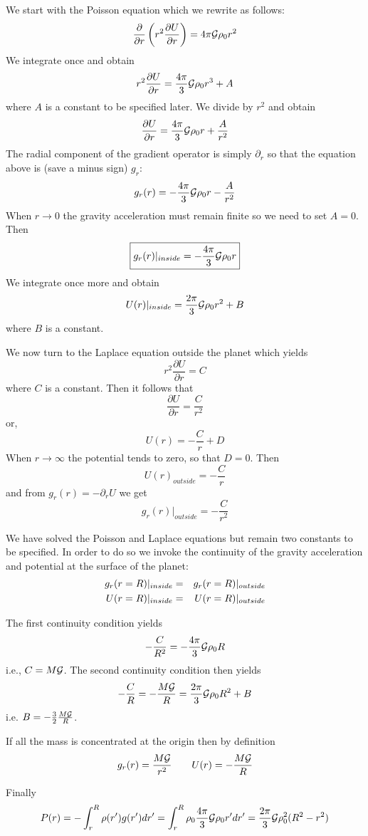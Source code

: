We start with the Poisson equation which we rewrite as follows:
\[
\frac{\partial }{\partial r}\left( r^2 \frac{\partial U}{\partial r}\right)
= 4 \pi {\cal G} \rho_0 r^2 
\]
We integrate once and obtain
\[
r^2 \frac{\partial U}{\partial r}
= \frac{4 \pi}{3} {\cal G} \rho_0 r^3 + A 
\]
where $A$ is a constant to be specified later. We divide by $r^2$ and obtain 
\[
\frac{\partial U}{\partial r}
= \frac{4 \pi}{3} {\cal G} \rho_0 r + \frac{A}{r^2}
\]
The radial component of the gradient operator is simply $\partial_r$ so that the equation 
above is (save a minus sign) $g_r$:
\[
g_r(r) = - \frac{4 \pi}{3} {\cal G} \rho_0 r - \frac{A}{r^2}
\]
When $r\rightarrow 0$ the gravity acceleration must remain finite so we need to set $A=0$. Then 
\[
\boxed{
g_r(r)|_{inside} = - \frac{4 \pi}{3} {\cal G} \rho_0 r 
}
\]
We integrate once more and obtain 
\[
U(r)|_{inside} = \frac{2\pi}{3}{\cal G} \rho_0 r^2 + B
\]
where $B$ is a constant.

We now turn to the Laplace equation outside the planet which yields
\[
r^2 \frac{\partial U}{\partial r}  = C 
\]
where $C$ is a constant. Then it follows that 
\[
\frac{\partial U}{\partial r}  = \frac{C}{r^2} 
\]
or, 
\[
U(r) = -\frac{C}{r} + D
\]
When $r \rightarrow \infty$ the potential tends to zero, so that $D=0$. 
Then 
\[
\boxed{
U(r)_{outside} = -\frac{C}{r}
}
\]
and from $g_r(r)=-\partial_r U$ we get
\[
g_r(r)|_{outside} = -\frac{C}{r^2}
\]

We have solved the Poisson and Laplace equations but remain two constants to be specified. 
In order to do so we invoke the continuity of the gravity acceleration and potential at the 
surface of the planet:
\begin{eqnarray}
g_r(r=R)|_{inside}&=&g_r(r=R)|_{outside} \nonumber\\
U(r=R)|_{inside}&=&U(r=R)|_{outside} \nonumber
\end{eqnarray}

The first continuity condition yields
\[
-\frac{C}{R^2} = -\frac{4\pi}{3} {\cal G} \rho_0 R
\]
i.e., $C = M {\cal G}$. 
The second continuity condition then yields
\[
-\frac{C}{R} = -\frac{M {\cal G}}{R} = 
\frac{2\pi}{3}{\cal G} \rho_0 R^2 + B
\]
i.e. $B = -\frac32 \frac{M {\cal G}}{R}$.

If all the mass is concentrated at the origin then by definition
\[
g_r(r) = \frac{M {\cal G}}{r^2} 
\qquad
U(r) = -\frac{M {\cal G}}{R} 
\]

Finally
\[
P(r) = -\int_r^R \rho(r') g(r') dr' = \int_r^R \rho_0 \frac{4\pi}{3} {\cal G} \rho_0 r' dr' 
= \frac{2 \pi}{3} {\cal G} \rho_0^2 (R^2-r^2)
\]


